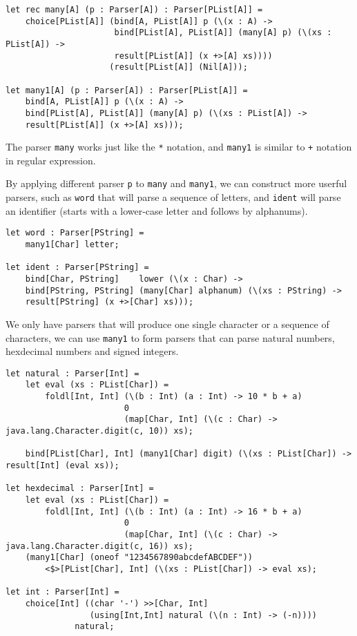 \begin{lstlisting}
let rec many[A] (p : Parser[A]) : Parser[PList[A]] =
    choice[PList[A]] (bind[A, PList[A]] p (\(x : A) ->
                      bind[PList[A], PList[A]] (many[A] p) (\(xs : PList[A]) ->
                      result[PList[A]] (x +>[A] xs))))
                     (result[PList[A]] (Nil[A]));

let many1[A] (p : Parser[A]) : Parser[PList[A]] =
    bind[A, PList[A]] p (\(x : A) ->
    bind[PList[A], PList[A]] (many[A] p) (\(xs : PList[A]) ->
    result[PList[A]] (x +>[A] xs)));
\end{lstlisting}

The parser \texttt{many} works just like the \texttt{*} notation, and \texttt{many1} is similar to \texttt{+} notation in regular expression.

By applying different parser \texttt{p} to \texttt{many} and \texttt{many1}, we can construct more userful parsers, such as \texttt{word} that will parse a sequence of letters, and \texttt{ident} will parse an identifier (starts with a lower-case letter and follows by alphanums).

\begin{lstlisting}
let word : Parser[PString] =
    many1[Char] letter;

let ident : Parser[PString] =
    bind[Char, PString]    lower (\(x : Char) ->
    bind[PString, PString] (many[Char] alphanum) (\(xs : PString) ->
    result[PString] (x +>[Char] xs)));
\end{lstlisting}

We only have parsers that will produce one single character or a sequence of characters, we can use \texttt{many1} to form parsers that can parse natural numbers, hexdecimal numbers and signed integers.

\begin{lstlisting}
let natural : Parser[Int] =
    let eval (xs : PList[Char]) =
        foldl[Int, Int] (\(b : Int) (a : Int) -> 10 * b + a)
                        0
                        (map[Char, Int] (\(c : Char) -> java.lang.Character.digit(c, 10)) xs);

    bind[PList[Char], Int] (many1[Char] digit) (\(xs : PList[Char]) -> result[Int] (eval xs));

let hexdecimal : Parser[Int] =
    let eval (xs : PList[Char]) =
        foldl[Int, Int] (\(b : Int) (a : Int) -> 16 * b + a)
                        0
                        (map[Char, Int] (\(c : Char) -> java.lang.Character.digit(c, 16)) xs);
    (many1[Char] (oneof "1234567890abcdefABCDEF"))
        <$>[PList[Char], Int] (\(xs : PList[Char]) -> eval xs);

let int : Parser[Int] =
    choice[Int] ((char '-') >>[Char, Int]
                 (using[Int,Int] natural (\(n : Int) -> (-n))))
              natural;
\end{lstlisting}

